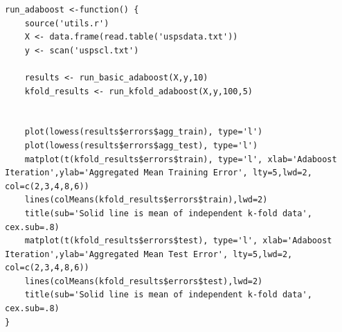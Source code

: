 \documentclass[11pt]{article}
\theoremstyle{quest}
\begin{document}
\begin{lstlisting}
run_adaboost <-function() {
    source('utils.r')
    X <- data.frame(read.table('uspsdata.txt'))
    y <- scan('uspscl.txt')

    results <- run_basic_adaboost(X,y,10)
    kfold_results <- run_kfold_adaboost(X,y,100,5)


    plot(lowess(results$errors$agg_train), type='l')
    plot(lowess(results$errors$agg_test), type='l')
    matplot(t(kfold_results$errors$train), type='l', xlab='Adaboost Iteration',ylab='Aggregated Mean Training Error', lty=5,lwd=2, col=c(2,3,4,8,6))
    lines(colMeans(kfold_results$errors$train),lwd=2)
    title(sub='Solid line is mean of independent k-fold data', cex.sub=.8)
    matplot(t(kfold_results$errors$test), type='l', xlab='Adaboost Iteration',ylab='Aggregated Mean Test Error', lty=5,lwd=2, col=c(2,3,4,8,6))
    lines(colMeans(kfold_results$errors$test),lwd=2)
    title(sub='Solid line is mean of independent k-fold data', cex.sub=.8)
}
\end{lstlisting}

\end{document}
